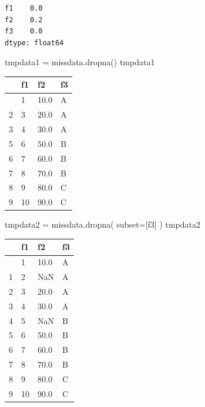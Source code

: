 \documentclass[
  a4paper,
  DIV=11,
  numbers=noendperiod]{scrreprt}
\newenvironment{Shaded}{\begin{snugshade}}{\end{snugshade}}
\newcommand{\NormalTok}[1]{\textcolor[rgb]{0.00,0.23,0.31}{#1}}
\newcommand{\OperatorTok}[1]{\textcolor[rgb]{0.37,0.37,0.37}{#1}}
\newcommand{\StringTok}[1]{\textcolor[rgb]{0.13,0.47,0.30}{#1}}
\begin{document}
\begin{verbatim}
f1    0.0
f2    0.2
f3    0.0
dtype: float64
\end{verbatim}

\begin{Shaded}
\begin{Highlighting}[]
\NormalTok{tmpdata1 }\OperatorTok{=}\NormalTok{ missdata.dropna()}
\NormalTok{tmpdata1}
\end{Highlighting}
\end{Shaded}

\begin{longtable}[]{@{}llll@{}}
\toprule\noalign{}
& f1 & f2 & f3 \\
\midrule\noalign{}
\endhead
\bottomrule\noalign{}
\endlastfoot
0 & 1 & 10.0 & A \\
2 & 3 & 20.0 & A \\
3 & 4 & 30.0 & A \\
5 & 6 & 50.0 & B \\
6 & 7 & 60.0 & B \\
7 & 8 & 70.0 & B \\
8 & 9 & 80.0 & C \\
9 & 10 & 90.0 & C \\
\end{longtable}

\begin{Shaded}
\begin{Highlighting}[]
\NormalTok{tmpdata2 }\OperatorTok{=}\NormalTok{ missdata.dropna( subset}\OperatorTok{=}\NormalTok{[}\StringTok{\textquotesingle{}f3\textquotesingle{}}\NormalTok{] )}
\NormalTok{tmpdata2}
\end{Highlighting}
\end{Shaded}

\begin{longtable}[]{@{}llll@{}}
\toprule\noalign{}
& f1 & f2 & f3 \\
\midrule\noalign{}
\endhead
\bottomrule\noalign{}
\endlastfoot
0 & 1 & 10.0 & A \\
1 & 2 & NaN & A \\
2 & 3 & 20.0 & A \\
3 & 4 & 30.0 & A \\
4 & 5 & NaN & B \\
5 & 6 & 50.0 & B \\
6 & 7 & 60.0 & B \\
7 & 8 & 70.0 & B \\
8 & 9 & 80.0 & C \\
9 & 10 & 90.0 & C \\
\end{longtable}
\end{document}
